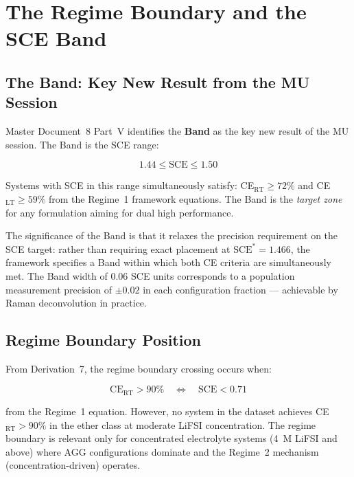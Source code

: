 \documentclass[11pt]{article}
\theoremstyle{plain}
\theoremstyle{definition}
\theoremstyle{remark}
\begin{document}
\section{The Regime Boundary and the SCE Band}
\label{sec:band}

\subsection{The Band: Key New Result from the MU Session}

Master Document~8 Part~V identifies the \textbf{Band} as the
key new result of the MU session.  The Band is the SCE range:

\begin{equation}
  1.44 \leq \mathrm{SCE} \leq 1.50
  \label{eq:band}
\end{equation}

Systems with SCE in this range simultaneously satisfy:
CE$_\mathrm{RT} \geq 72\%$ and CE$_\mathrm{LT} \geq 59\%$
from the Regime~1 framework equations.  The Band is the
\emph{target zone} for any formulation aiming for dual
high performance.

The significance of the Band is that it relaxes the precision
requirement on the SCE target: rather than requiring exact
placement at $\mathrm{SCE}^{*} = 1.466$, the framework
specifies a Band within which both CE criteria are
simultaneously met.  The Band width of $0.06$ SCE units
corresponds to a population measurement precision of
$\pm 0.02$ in each configuration fraction --- achievable
by Raman deconvolution in practice.

\subsection{Regime Boundary Position}

From Derivation~7, the regime boundary crossing occurs when:

\begin{equation}
  \mathrm{CE}_\mathrm{RT} > 90\% \quad \Leftrightarrow \quad
  \mathrm{SCE} < 0.71
  \label{eq:regime_boundary}
\end{equation}

from the Regime~1 equation.  However, no system in the dataset
achieves CE$_\mathrm{RT} > 90\%$ in the ether class at
moderate LiFSI concentration.  The regime boundary is relevant
only for concentrated electrolyte systems (4~M LiFSI and above)
where AGG configurations dominate and the Regime~2 mechanism
(concentration-driven) operates.
\end{document}
